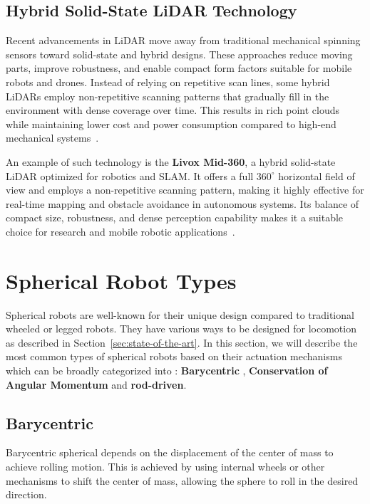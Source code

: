 \documentclass[english, bachelor, utf8]{base/thesis_telematics}
\begin{document}
\subsection{Hybrid Solid-State LiDAR Technology}
Recent advancements in LiDAR move away from traditional mechanical spinning sensors toward solid-state and hybrid designs. 
These approaches reduce moving parts, improve robustness, and enable compact form factors suitable for mobile robots and drones. 
Instead of relying on repetitive scan lines, some hybrid LiDARs employ non-repetitive scanning patterns that gradually fill in the environment with dense coverage over time. 
This results in rich point clouds while maintaining lower cost and power consumption compared to high-end mechanical systems~\cite{globalgps_lidar_types,govcomm_compared}.  

An example of such technology is the \textbf{Livox Mid-360}, a hybrid solid-state LiDAR optimized for robotics and SLAM. 
It offers a full \(360^\circ\) horizontal field of view and employs a non-repetitive scanning pattern, making it highly effective for real-time mapping and obstacle avoidance in autonomous systems. Its balance of compact size, robustness, and dense perception capability makes it a suitable choice for research and mobile robotic applications~\cite{livox_mid360_docs}.

\section{Spherical Robot Types}
\label{sec:spherical-robot-types}
Spherical robots are well-known for their unique design compared to traditional wheeled or legged robots.
They have various ways to be designed for locomotion as described in Section~\ref{sec:state-of-the-art}.
In this section, we will describe the most common types of spherical robots based on their actuation mechanisms which can be broadly categorized into : \textbf{Barycentric} , \textbf{Conservation of Angular Momentum} and \textbf{rod-driven}.
\subsection{Barycentric}
Barycentric spherical depends on the displacement of the center of mass to achieve rolling motion.
This is achieved by using internal wheels or other mechanisms to shift the center of mass, allowing the sphere to roll in the desired direction.~\cite{Aminata}
\end{document}
